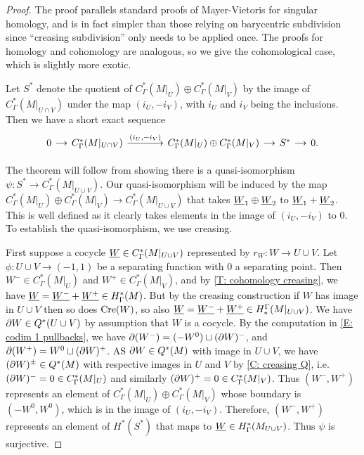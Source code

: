 \begin{proof}
The proof parallels standard proofs of Mayer-Vietoris for singular homology, and is in fact simpler than those relying on barycentric subdivision since ``creasing subdivision'' only needs to be applied once. The proofs for homology and cohomology are analogous, so we give the cohomological case, which is slightly more exotic.


Let $S^*$ denote the quotient of $C_{\Gamma}^*(M|_U) \oplus C_{\Gamma}^{*}(M|_V)$ by the image of $C_{\Gamma}^*(M|_{U \cap V})$ under the map $(i_U, -i_V)$, with $i_U$ and $i_V$ being the inclusions.
Then we have a short exact sequence
\begin{equation}\label{E: homology MV SES}
\begin{tikzcd}[
column sep = small,
arrow style = math font,
cells = {nodes = {text height = 2ex,text depth = 0.75ex}}
]
0 \arrow[r] &
C_{\Gamma}^{*}(M|_{U \cap V}) \arrow[r, "(i_U{,}-i_V)"] &[25pt]
C_{\Gamma}^*(M|_U) \oplus C_{\Gamma}^{*}(M|_V) \arrow[r] &
S^* \arrow[r] &
0.
\end{tikzcd}
\end{equation}

The theorem will follow from showing there is a quasi-isomorphism $\psi:S^* \to C_{\Gamma}^*(M|_{U \cup V})$.
Our quasi-isomorphism will be induced by the map $C_{\Gamma}^*(M|_U) \oplus C_{\Gamma}^{*}(M|_V) \to C_{\Gamma}^*(M|_{U \cup V})$ that takes $\underline{W}_1 \oplus \underline{W}_2$ to $\underline{W}_1+\underline{W}_2$. This is well defined as it clearly takes elements in the image of $(i_U{,}-i_V)$ to $0$. To establish the quasi-isomorphism, we use creasing.

First suppose a cocycle $\underline{W} \in C_{\Gamma}^*(M|_{U \cup V})$ represented by $r_W \colon W \to U \cup V$. Let $\phi:U \cup V \to (-1,1)$ be a separating function with $0$ a separating point. Then $W^- \in C_{\Gamma}^*(M|_{U})$ and $W^+ \in C_{\Gamma}^*(M|_{V})$, and by \cref{T: cohomology creasing}, we have $\underline{W} = \underline{W^-}+\underline{W^+} \in H^*_\Gamma(M)$. But by the creasing construction if $W$ has image in $U \cup V$ then so does $\mathrm{Cre}(W)$, so also $\underline{W} = \underline{W^-}+\underline{W^+} \in H_*^\Gamma(M|_{U \cup V})$. We have $\partial W \in Q^*(U \cup V)$ by assumption that $W$ is a cocycle. By the computation in \cref{E: codim 1 pullbacks}, we have $\partial( W^-) = (-W^0)\sqcup (\partial W)^-$, and $\partial (W^+) = W^0\sqcup (\partial W)^+$. AS $\partial W \in Q^*(M)$ with image in $U \cup V$, we have $(\partial W)^\pm \in Q^*(M)$ with respective images in $U$ and $V$ by \cref{C: creasing Q}, i.e.\ $(\partial W)^- = 0 \in C^*_\Gamma(M|_U)$ and similarly $(\partial W)^+ = 0 \in C^*_\Gamma(M|_V)$.
Thus $(W^-, W^+)$ represents an element of $C_{\Gamma}^*(M|_U) \oplus C_{\Gamma}^{*}(M|_V)$ whose boundary is $(-W^0,W^0)$, which is in the image of $(i_U,-i_V)$. Therefore, $(W^-, W^+)$ represents an element of
$H^*(S^*)$ that maps to $\underline{W} \in H^*_\Gamma(M_{U \cup V})$. Thus $\psi$ is surjective.



\end{proof}
